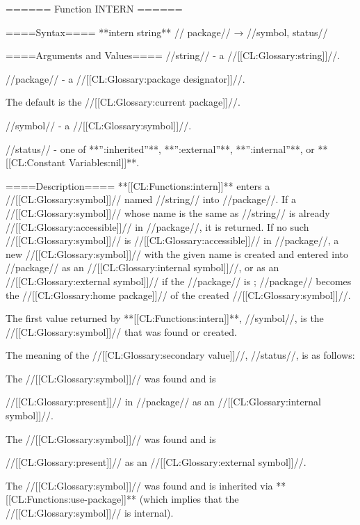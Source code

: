 ====== Function INTERN ======

====Syntax====
**intern {string** //\opt} package// → //symbol, status//

====Arguments and Values====
//string// - a //[[CL:Glossary:string]]//.

//package// - a //[[CL:Glossary:package designator]]//.

The default is the //[[CL:Glossary:current package]]//.

//symbol// - a //[[CL:Glossary:symbol]]//.

//status// - one of **'':inherited''**, **'':external''**, **'':internal''**, or **[[CL:Constant Variables:nil]]**.

====Description====
**[[CL:Functions:intern]]** enters a //[[CL:Glossary:symbol]]// named //string// into //package//. If a //[[CL:Glossary:symbol]]// whose name is the same as //string// is already //[[CL:Glossary:accessible]]// in //package//, it is returned. If no such //[[CL:Glossary:symbol]]// is //[[CL:Glossary:accessible]]// in //package//, a new //[[CL:Glossary:symbol]]// with the given name is created and entered into //package// as an //[[CL:Glossary:internal symbol]]//, or as an //[[CL:Glossary:external symbol]]// if the //package// is ; //package// becomes the //[[CL:Glossary:home package]]// of the created //[[CL:Glossary:symbol]]//.

The first value returned by **[[CL:Functions:intern]]**, //symbol//, is the //[[CL:Glossary:symbol]]// that was found or created.

The meaning of the //[[CL:Glossary:secondary value]]//, //status//, is as follows: \beginlist {}

The //[[CL:Glossary:symbol]]// was found and is

//[[CL:Glossary:present]]// in //package// as an //[[CL:Glossary:internal symbol]]//.


The //[[CL:Glossary:symbol]]// was found and is

//[[CL:Glossary:present]]// as an //[[CL:Glossary:external symbol]]//.


The //[[CL:Glossary:symbol]]// was found and is inherited via **[[CL:Functions:use-package]]** (which implies that the //[[CL:Glossary:symbol]]// is internal).


